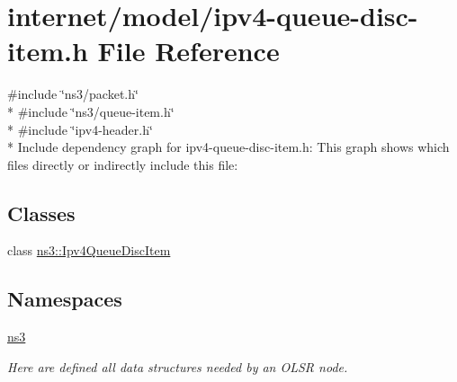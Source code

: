\hypertarget{ipv4-queue-disc-item_8h}{}\section{internet/model/ipv4-\/queue-\/disc-\/item.h File Reference}
\label{ipv4-queue-disc-item_8h}
{\ttfamily \#include \char`\"{}ns3/packet.\+h\char`\"{}}\\*
{\ttfamily \#include \char`\"{}ns3/queue-\/item.\+h\char`\"{}}\\*
{\ttfamily \#include \char`\"{}ipv4-\/header.\+h\char`\"{}}\\*
Include dependency graph for ipv4-\/queue-\/disc-\/item.h\+:
This graph shows which files directly or indirectly include this file\+:
\subsection*{Classes}
\begin{DoxyCompactItemize}
\item 
class \hyperlink{classns3_1_1Ipv4QueueDiscItem}{ns3\+::\+Ipv4\+Queue\+Disc\+Item}
\end{DoxyCompactItemize}
\subsection*{Namespaces}
\begin{DoxyCompactItemize}
\item 
 \hyperlink{namespacens3}{ns3}
\begin{DoxyCompactList}\small\item\em Here are defined all data structures needed by an O\+L\+SR node. \end{DoxyCompactList}\end{DoxyCompactItemize}
